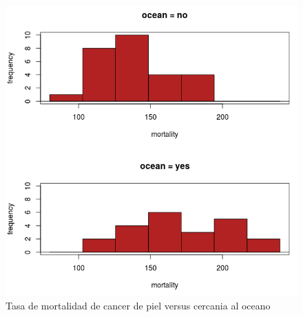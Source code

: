\documentclass[11pt,evaluacion]{uescimat}
\begin{document}
\begin{problema}
\begin{figure}[H]
\begin{centering}
\includegraphics[scale=0.30]{imagen6.png}
\par\end{centering}
\caption{Tasa de mortalidad de cancer de piel versus cercania al oceano}
\end{figure}



\end{problema}
\end{document}
